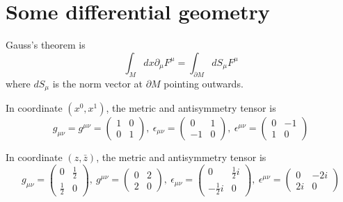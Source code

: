 \documentclass[12pt]{book}
\begin{document}
	\chapter{Some differential geometry}
	
	Gauss's theorem is
	\begin{equation}
		\int_M dx\partial_\mu F^{\mu}=\int_{\partial M} dS_\mu F^\mu
	\end{equation}
	where $dS_\mu$ is the norm vector at $\partial M$ pointing outwards.
	
	In coordinate $(x^0,x^1)$, the metric and antisymmetry tensor is 
	\begin{equation}
		g_{\mu\nu}=g^{\mu\nu}=\begin{pmatrix}
		1&0\\
		0&1
		\end{pmatrix},\
		\epsilon_{\mu\nu}=\begin{pmatrix}
		0&1\\
		-1&0
		\end{pmatrix},\ 
		\epsilon^{\mu\nu}=\begin{pmatrix}
		0&-1\\
		1&0
		\end{pmatrix} 
	\end{equation}
	
	In coordinate $(z,\bar z)$, the metric and antisymmetry tensor is 
	\begin{equation}
		g_{\mu\nu}=\begin{pmatrix}
		0&\frac 12\\
		\frac 12&0
		\end{pmatrix},\ 
		g^{\mu\nu}=\begin{pmatrix}
		0&2\\
		2&0
		\end{pmatrix},\
		\epsilon_{\mu\nu}=\begin{pmatrix}
		0&\frac 12 i\\
		-\frac 12 i&0
		\end{pmatrix},\ 
		\epsilon^{\mu\nu}=\begin{pmatrix}
		0&-2i\\
		2i&0
		\end{pmatrix} 
	\end{equation}
	
	



\end{document}

